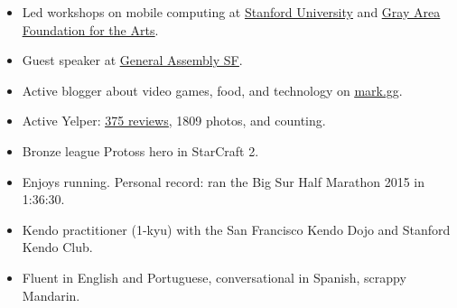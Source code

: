 

\begin{cvparagraph}


\begin{justify}
\begin{itemize}[leftmargin=2ex, nosep]
    \setlength{\parskip}{0pt}
    \setlength\itemsep{0.15em}
    \renewcommand{\labelitemi}{\bullet}
    
    \item Led workshops on mobile computing at \href{https://ccrma.stanford.edu/workshops/music-and-mobile-computing}{\underline{Stanford University}} and \href{http://main.dev.gaffta.org/?author=81}{\underline{Gray Area Foundation for the Arts}}.
    \item Guest speaker at \href{https://generalassemb.ly/instructors/mark-cerqueira/10476}{\underline{General Assembly SF}}.
	\item Active blogger about video games, food, and technology on \href{mark.gg}{\underline{mark.gg}}.
	\item Active Yelper: \href{markcerqueira.yelp.com}{\underline{375 reviews}}, 1809 photos, and counting.
	\item Bronze league Protoss hero in StarCraft 2.
	\item Enjoys running. Personal record: ran the Big Sur Half Marathon 2015 in 1:36:30.
	\item Kendo practitioner (1-kyu) with the San Francisco Kendo Dojo and Stanford Kendo Club.
	\item Fluent in English and Portuguese, conversational in Spanish, scrappy Mandarin.
	

\end{itemize}
\end{justify}

\end{cvparagraph}